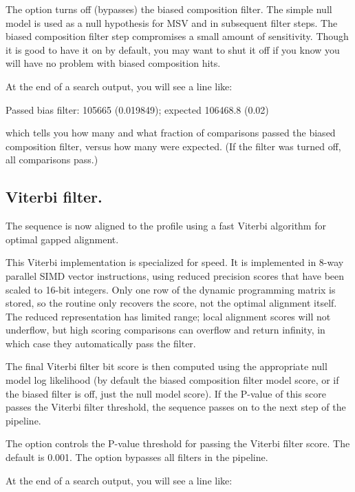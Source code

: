 The  option turns off (bypasses) the biased
composition filter.  The simple null model is used as a null
hypothesis for MSV and in subsequent filter steps. The biased
composition filter step compromises a small amount of sensitivity.
Though it is good to have it on by default, you may want to shut it
off if you know you will have no problem with biased composition hits.

 At the end of a search output, you will see a line like:

\begin{sreoutput}
 Passed bias filter:                   105665  (0.019849); expected 106468.8 (0.02)
\end{sreoutput}

which tells you how many and what fraction of comparisons passed the
biased composition filter, versus how many were expected. (If the
filter was turned off, all comparisons pass.)


\subsection{Viterbi filter.}

The sequence is now aligned to the profile using a fast Viterbi
algorithm for optimal gapped alignment.

This Viterbi implementation is specialized for speed.  It is
implemented in 8-way parallel SIMD vector instructions, using reduced
precision scores that have been scaled to 16-bit integers. Only one
row of the dynamic programming matrix is stored, so the routine only
recovers the score, not the optimal alignment itself. The reduced
representation has limited range; local alignment scores will not
underflow, but high scoring comparisons can overflow and return
infinity, in which case they automatically pass the filter.

The final Viterbi filter bit score is then computed using the
appropriate null model log likelihood (by default the biased
composition filter model score, or if the biased filter is off, just
the null model score). If the P-value of this score passes the Viterbi
filter threshold, the sequence passes on to the next step of the
pipeline.
 
The  option controls the P-value threshold for passing
the Viterbi filter score. The default is 0.001.
The  option bypasses all filters in the pipeline.


At the end of a search output, you will see a line like:

